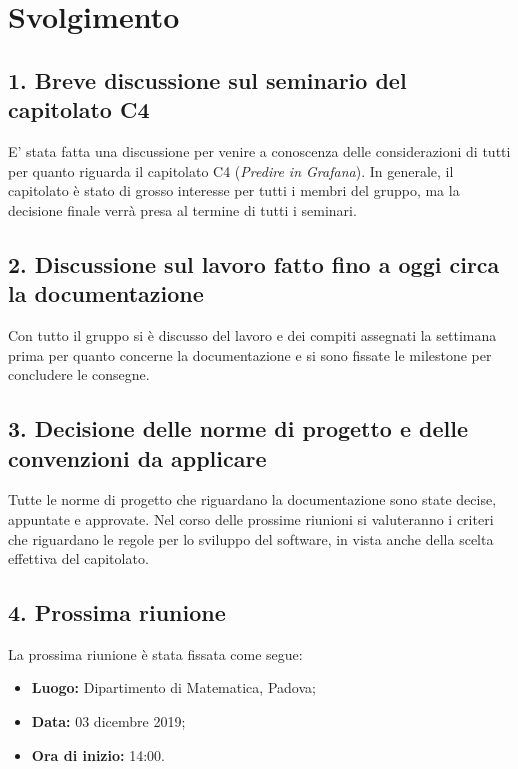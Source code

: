 \newpage
\section*{Svolgimento}

\subsection*{1. Breve discussione sul seminario del capitolato C4 }

E' stata fatta una discussione per venire a conoscenza delle considerazioni di tutti per quanto riguarda il capitolato C4 (\textit{Predire in Grafana}). In generale, il capitolato è stato di grosso interesse per tutti i membri del gruppo, ma la decisione finale verrà presa al termine di tutti i seminari.

\subsection*{2. Discussione sul lavoro fatto fino a oggi circa la documentazione}

Con tutto il gruppo si è discusso del lavoro e dei compiti assegnati la settimana prima per quanto concerne la documentazione e si sono fissate le milestone per concludere le consegne.

\subsection*{3. Decisione delle norme di progetto e delle convenzioni da applicare}

Tutte le norme di progetto che riguardano la documentazione sono state decise, appuntate e approvate. Nel corso delle prossime riunioni si valuteranno i criteri che riguardano le regole per lo sviluppo del software, in vista anche della scelta effettiva del capitolato.

\subsection*{4. Prossima riunione}

La prossima riunione è stata fissata come segue:
\begin{itemize}
	\item \textbf{Luogo:} Dipartimento di Matematica, Padova;
	\item \textbf{Data:} 03 dicembre 2019;
	\item \textbf{Ora di inizio:} 14:00.
\end{itemize}
